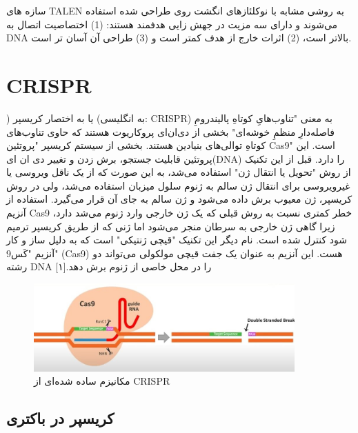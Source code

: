 \documentclass[12pt,a4paper,BCOR=.7cm,headsepline,bibliography=totoc]{report}
\begin{document}
سازه های TALEN به روشی مشابه با نوکلئازهای انگشت روی طراحی شده استفاده می‌شوند و دارای سه مزیت در جهش زایی هدفمند هستند: (1) اختصاصیت اتصال به DNA بالاتر است، (2) اثرات خارج از هدف کمتر است و (3) طراحی آن آسان تر است.
\newpage
\section{CRISPR}
) یا به اختصار کریسپر (به انگلیسی: CRISPR) به معنی "تناوب‌هایِ کوتاهِ پالیندرومِ فاصله‌دارِ منظمِ خوشه‌ای" بخشی از دی‌ان‌ای پروکاریوت هستند که حاوی تناوب‌های کوتاهِ توالی‌های بنیادین هستند. بخشی از سیستم کریسپر "پروتئین Cas9" است. این پروتئین قابلیت جستجو، برش زدن و تغییر دی ان ای(DNA) را دارد. قبل از این تکنیک از روش "تحویل یا انتقال ژن" استفاده می‌شد، به این صورت که از یک ناقل ویروسی یا غیرویروسی برای انتقال ژن سالم به ژنوم سلول میزبان استفاده می‌شد، ولی در روش کریسپر، ژن معیوب برش داده می‌شود و ژن سالم به جای آن قرار می‌گیرد. استفاده از آنزیم Cas9 خطر کمتری نسبت به روش قبلی که یک ژن خارجی وارد ژنوم می‌شد دارد، زیرا گاهی ژن خارجی به سرطان منجر می‌شود اما ژنی که از طریق کریسپر ترمیم شود کنترل شده است. نام دیگر این تکنیک "قیچی ژنتیکی" است که به دلیل ساز و کار آنزیم "کَس9" (Cas9) هست. این آنزیم به عنوان یک جفت قیچی مولکولی می‌تواند دو رشته DNA را در محل خاصی از ژنوم برش دهد.[۱]
\begin{figure}[!h]
\centering
\includegraphics[width=10cm, ]{pictures/simple_crispr.jpg}
\caption{
مکانیزم ساده شده‌ای از CRISPR
}\label{fig:1}
\end{figure}

\subsection{کریسپر در باکتری}
\end{document}
